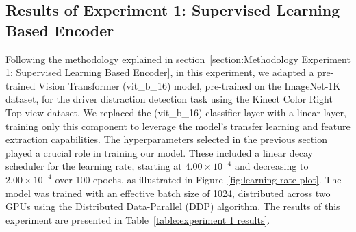 \subsection{Results of Experiment 1: Supervised Learning Based Encoder}
Following the methodology explained in section~\ref{section:Methodology Experiment 1: Supervised Learning Based Encoder}, in this experiment, we adapted a pre-trained Vision Transformer (vit\_b\_16) model, pre-trained on the ImageNet-1K dataset, for the driver distraction detection task using the Kinect Color Right Top view dataset. We replaced the (vit\_b\_16) classifier layer with a linear layer, training only this component to leverage the model's transfer learning and feature extraction capabilities. The hyperparameters selected in the previous section played a crucial role in training our model. These included a linear decay scheduler for the learning rate, starting at $4.00 \times 10^{-4}$ and decreasing to $2.00 \times 10^{-4}$ over 100 epochs, as illustrated in Figure~\ref{fig:learning rate plot}. The model was trained with an effective batch size of 1024, distributed across two GPUs using the Distributed Data-Parallel (DDP) algorithm. The results of this experiment are presented in Table~\ref{table:experiment 1 results}.
